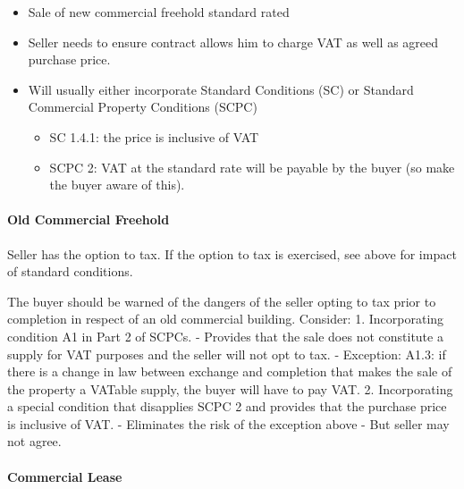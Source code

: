 \documentclass[
]{article}
\newenvironment{Shaded}{}{}
\newcommand{\NormalTok}[1]{#1}
\providecommand{\tightlist}{%
  \setlength{\itemsep}{0pt}\setlength{\parskip}{0pt}}
\begin{document}
\begin{itemize}
\tightlist
\item
  Sale of new commercial freehold standard rated
\item
  Seller needs to ensure contract allows him to charge VAT as well as
  agreed purchase price.
\item
  Will usually either incorporate Standard Conditions (SC) or Standard
  Commercial Property Conditions (SCPC)

  \begin{itemize}
  \tightlist
  \item
    SC 1.4.1: the price is inclusive of VAT
  \item
    SCPC 2: VAT at the standard rate will be payable by the buyer (so
    make the buyer aware of this).
  \end{itemize}
\end{itemize}

\hypertarget{old-commercial-freehold}{%
\paragraph{Old Commercial Freehold}\label{old-commercial-freehold}}

Seller has the option to tax. If the option to tax is exercised, see
above for impact of standard conditions.

\begin{Shaded}
\begin{Highlighting}[]
\NormalTok{The buyer should be warned of the dangers of the seller opting to tax prior to completion in respect of an old commercial building. Consider:}
\NormalTok{1. Incorporating condition A1 in Part 2 of SCPCs.}
\NormalTok{    {-}  Provides that the sale does not constitute a supply for VAT purposes and the seller will not opt to tax. }
\NormalTok{    {-} Exception: A1.3: if there is a change in law between exchange and completion that makes the sale of the property a VATable supply, the buyer will have to pay VAT. }
\NormalTok{2. Incorporating a special condition that disapplies SCPC 2 and provides that the purchase price is inclusive of VAT. }
\NormalTok{    {-} Eliminates the risk of the exception above}
\NormalTok{    {-} But seller may not agree. }
\end{Highlighting}
\end{Shaded}

\hypertarget{commercial-lease}{%
\paragraph{Commercial Lease}\label{commercial-lease}}
\end{document}
